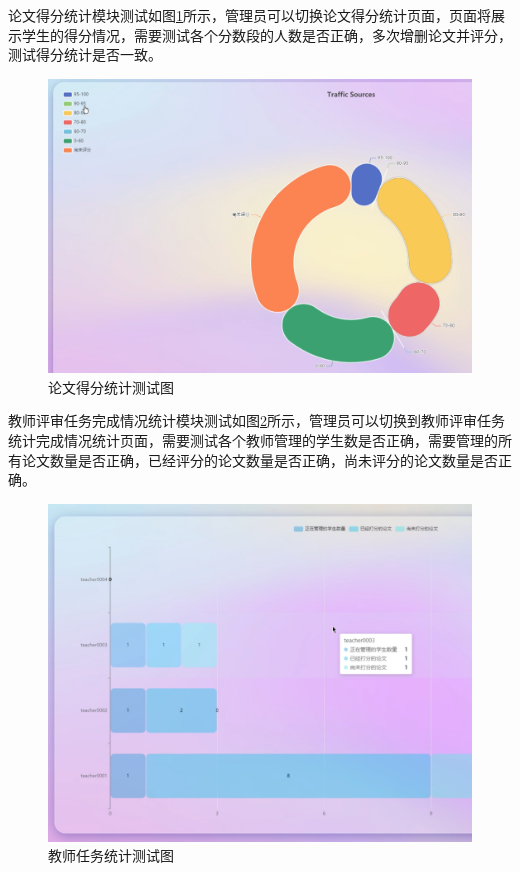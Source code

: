 论文得分统计模块测试如图\ref{statistic-score-student-test}所示，管理员可以切换论文得分统计页面，页面将展示学生的得分情况，需要测试各个分数段的人数是否正确，多次增删论文并评分，测试得分统计是否一致。

\begin{figure}[htbp]
  \centering
  \includegraphics[scale = 0.48]{out/figure/测试/statistic-score-student-test.png}
  \caption{\song\wuhao 论文得分统计测试图}
  \label{statistic-score-student-test}
\end{figure}

教师评审任务完成情况统计模块测试如图\ref{statistic-teacher-task-test}所示，管理员可以切换到教师评审任务统计完成情况统计页面，需要测试各个教师管理的学生数是否正确，需要管理的所有论文数量是否正确，已经评分的论文数量是否正确，尚未评分的论文数量是否正确。

\begin{figure}[htbp]
  \centering
  \includegraphics[scale = 0.48]{out/figure/测试/statistic-teacher-task-test.png}
  \caption{\song\wuhao 教师任务统计测试图}
  \label{statistic-teacher-task-test}
\end{figure}

